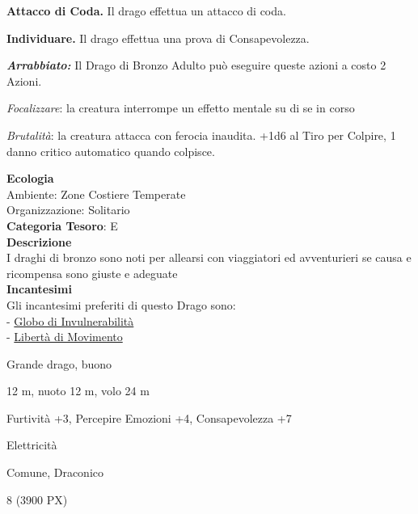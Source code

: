 \begin{multicols}{2}
{\textbf{Attacco di Coda.} Il drago effettua un attacco di coda.

\textbf{Individuare.} Il drago effettua una prova di Consapevolezza.

\emph{\textbf{Arrabbiato:}} Il Drago di Bronzo Adulto può eseguire queste azioni a costo 2 Azioni.

\emph{Focalizzare}: la creatura interrompe un effetto mentale su di se in corso

\emph{Brutalità}: la creatura attacca con ferocia inaudita. +1d6 al Tiro per Colpire, 1 danno critico automatico quando colpisce.

\textbf{Ecologia}\\
Ambiente: Zone Costiere Temperate\\
Organizzazione: Solitario\\
\textbf{Categoria Tesoro}: E\\
\textbf{Descrizione}\\
I draghi di bronzo sono noti per allearsi con viaggiatori ed avventurieri se causa e ricompensa sono giuste e adeguate\\
\textbf{Incantesimi}\\
Gli incantesimi preferiti di questo Drago sono:\\
- \hyperlink{Globo di Invulnerabilità}{Globo di Invulnerabilità}\\
- \hyperlink{Libertà di Movimento}{Libertà di Movimento}


\begin{description}[noitemsep, topsep=0pt, parsep=0pt, partopsep=0pt, itemsep=1pt, leftmargin=2.35cm,  labelwidth=2.2cm, itemindent=0cm, listparindent=0pt] %
\setlength{\baselineskip}{10pt}
\item[\textbf{Taglia/Tipo}] Grande drago, buono
\item[\textbf{Caratt.}] 
\item[\textbf{Punti Ferita}] 
\item[\textbf{Movimento}] 12 m, nuoto 12 m, volo 24 m
\item[\textbf{Tiri Salvez.}] 
\item[\textbf{Comp.}] Furtività +3, Percepire Emozioni +4, Consapevolezza +7
\item[\textbf{Imm. Danni}] Elettricità
\item[\textbf{Sensi}] 
\item[\textbf{Linguaggi}] Comune, Draconico
\item[\textbf{Sfida}] 8 (3900 PX)
\end{description}
\smallskip

}
\end{multicols}

